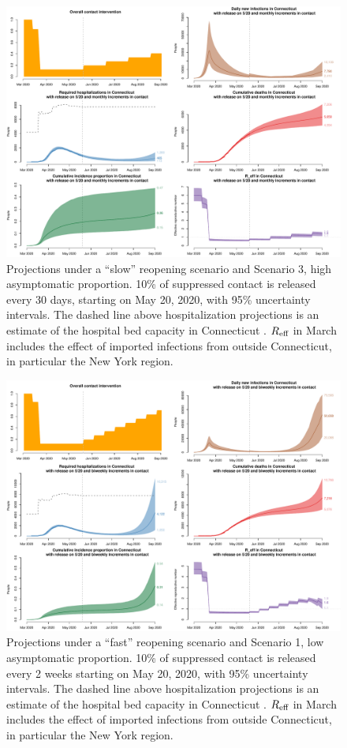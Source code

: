 \documentclass[11pt]{article}
\begin{document}
\begin{figure} %
	\centering
	\includegraphics[width=.9\textwidth]{figures/slow_high_full.pdf}
	\caption{Projections under a ``slow'' reopening scenario and Scenario 3, high asymptomatic proportion. 10\% of suppressed contact is released every 30 days, starting on May 20, 2020, with 95\% uncertainty intervals. The dashed line above hospitalization projections is an estimate of the hospital bed capacity in Connecticut \citep{CHAwebsite}. $R\textsubscript{eff}$ in March includes the effect of imported infections from outside Connecticut, in particular the New York region.}
	\label{fig:slow_high}
\end{figure}


\begin{figure} %
	\centering
	\includegraphics[width=.9\textwidth]{figures/fast_low_full.pdf}
	\caption{Projections under a ``fast'' reopening scenario and Scenario 1, low asymptomatic proportion. 10\% of suppressed contact is released every 2 weeks starting on May 20, 2020, with 95\% uncertainty intervals. The dashed line above hospitalization projections is an estimate of the hospital bed capacity in Connecticut \citep{CHAwebsite}. $R\textsubscript{eff}$ in March includes the effect of imported infections from outside Connecticut, in particular the New York region.}
	\label{fig:fast_low}
\end{figure}
\end{document}
